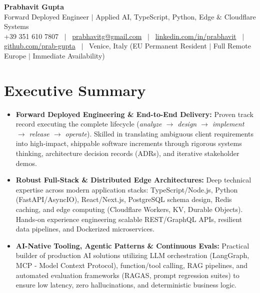 \documentclass[a4paper,10pt]{article}
\begin{document}
\begin{minipage}[c]{0.80\textwidth}
  {\Huge\bfseries Prabhavit Gupta}\\[3pt]
  {\color{accent}\large Forward Deployed Engineer $\vert$ Applied AI, TypeScript, Python, Edge $\&$ Cloudflare Systems}\\[6pt]
  {\footnotesize +39 351 610 7807 ~$\vert$~
  \href{mailto:prabhavitg@gmail.com}{prabhavitg@gmail.com} ~$\vert$~
  \href{https://www.linkedin.com/in/prabhavit/}{linkedin.com/in/prabhavit} ~$\vert$~
  \href{https://github.com/prab-gupta}{github.com/prab-gupta} ~$\vert$~
  Venice, Italy (EU Permanent Resident $\vert$ Full Remote Europe $\vert$ Immediate Availability)}
\end{minipage}\hfill

\vspace{6pt}

\section{Executive Summary}
\begin{itemize}
  \item \textbf{Forward Deployed Engineering \& End-to-End Delivery:} Proven track record executing the complete lifecycle (\textit{analyze $\rightarrow$ design $\rightarrow$ implement $\rightarrow$ release $\rightarrow$ operate}). Skilled in translating ambiguous client requirements into high-impact, shippable software increments through rigorous systems thinking, architecture decision records (ADRs), and iterative stakeholder demos.
  \item \textbf{Robust Full-Stack \& Distributed Edge Architectures:} Deep technical expertise across modern application stacks: TypeScript/Node.js, Python (FastAPI/AsyncIO), React/Next.js, PostgreSQL schema design, Redis caching, and edge computing (Cloudflare Workers, KV, Durable Objects). Hands-on experience engineering scalable REST/GraphQL APIs, resilient data pipelines, and Dockerized microservices.
  \item \textbf{AI-Native Tooling, Agentic Patterns \& Continuous Evals:} Practical builder of production AI solutions utilizing LLM orchestration (LangGraph, MCP - Model Context Protocol), function/tool calling, RAG pipelines, and automated evaluation frameworks (RAGAS, prompt regression suites) to ensure low latency, zero hallucinations, and deterministic business logic.
\end{itemize}
\end{document}
